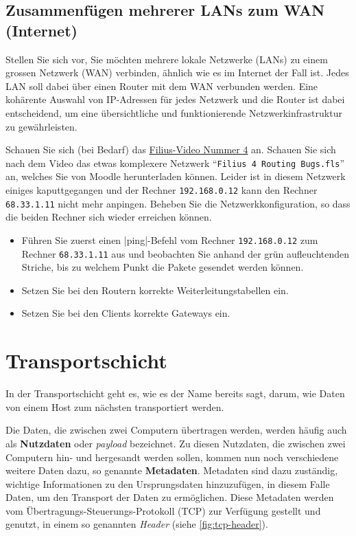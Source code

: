 \subsection{\texorpdfstring{Zusammenfügen mehrerer \glspl{LAN} zum \gls{WAN} (Internet)}{Zusammenfügen mehrerer LANs zum WAN (Internet)}}
Stellen Sie sich vor, Sie möchten mehrere lokale Netzwerke (\glspl{LAN}) zu einem grossen Netzwerk (\gls{WAN}) verbinden, ähnlich wie es im Internet der Fall ist. Jedes \gls{LAN} soll dabei über einen Router mit dem \gls{WAN} verbunden werden. Eine kohärente Auswahl von IP-Adressen für jedes Netzwerk und die Router ist dabei entscheidend, um eine übersichtliche und funktionierende Netzwerkinfrastruktur zu gewährleisten.


\begin{myexercise}
	Schauen Sie sich (bei Bedarf) das \href{https://www.youtube.com/watch?v=Kn8v_HrckUM&list=PLUfZiVdJui-57k0VcRecHX0JTEhOMgiKP}{Filius-Video Nummer 4} an. Schauen Sie sich nach dem Video das etwas komplexere Netzwerk \enquote{\texttt{Filius 4 Routing Bugs.fls}} an, welches Sie von Moodle herunterladen können. Leider ist in diesem Netzwerk einiges kaputtgegangen und der Rechner \texttt{192.168.0.12} kann den Rechner \texttt{68.33.1.11} nicht mehr anpingen. Beheben Sie die Netzwerkkonfiguration, so dass die beiden Rechner sich wieder erreichen können. 
	\begin{itemize}
		\item Führen Sie zuerst einen \commandbox*|ping|-Befehl vom Rechner \texttt{192.168.0.12} zum Rechner \texttt{68.33.1.11} aus und beobachten Sie anhand der grün aufleuchtenden Striche, bis zu welchem Punkt die Pakete gesendet werden können.
		\item Setzen Sie bei den Routern korrekte Weiterleitungstabellen ein.
		\item Setzen Sie bei den Clients korrekte Gateways ein.
	\end{itemize}
\end{myexercise}

\section{\texorpdfstring{\textcolor{\transportLayerColor}{Transportschicht}}{Transportschicht}}
In der Transportschicht geht es, wie es der Name bereits sagt, darum, wie Daten von einem Host zum nächsten transportiert werden.

Die Daten, die zwischen zwei Computern übertragen werden, werden häufig auch als \textbf{Nutzdaten} oder \textit{payload} bezeichnet. Zu diesen Nutzdaten, die zwischen zwei Computern hin- und hergesandt werden sollen, kommen nun noch verschiedene weitere Daten dazu, so genannte \textbf{Metadaten}. Metadaten sind dazu zuständig, wichtige Informationen zu den Ursprungsdaten hinzuzufügen, in diesem Falle Daten, um den Transport der Daten zu ermöglichen. Diese Metadaten werden vom Übertragungs-Steuerungs-Protokoll (\gls{TCP}) zur Verfügung gestellt und genutzt, in einem so genannten \textit{Header} (siehe \cref{fig:tcp-header}).

